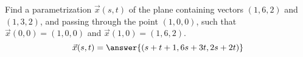\begin{problem}
Find a parametrization $\vec{x}(s,t)$ of the plane containing vectors $(1,6,2)$ and $(1,3,2)$, and passing through the point $(1,0,0)$, such that $\vec{x}(0,0) = (1,0,0)$ and $\vec{x}(1,0) = (1,6,2)$.
\[
\vec{x}(s,t) = \answer{(s+t+1, 6s+3t, 2s+2t)}
\]
\end{problem}
